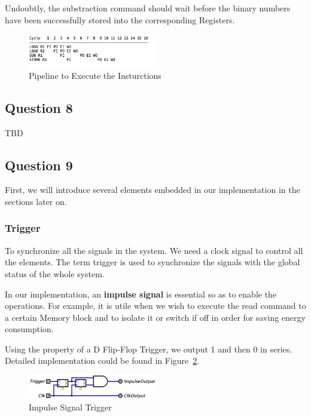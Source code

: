 \documentclass[conference]{IEEEtran}
\begin{document}
Undoubtly, the substraction command should wait before the binary numbers have been successfully stored into the corresponding Registers.

\begin{figure}[h!]
    \centering
    \includegraphics[width=0.5\textwidth]{assets/question-7.png}
    \caption{Pipeline to Execute the Insturctions}
    \label{fig:Question-7}
\end{figure}

\subsection{Question 8}


TBD

\subsection{Question 9}

First, we will introduce several elements embedded in our implementation in the sections later on.


\subsubsection{Trigger}



To synchronize all the signals in the system. We need a clock signal to control all the elements. The term trigger is used to synchronize the signals
with the global status of the whole system. 


In our implementation, an \textbf{impulse signal} is essential so as to enable the operations. For example, it is utile when we wish to execute the read command to a certain Memory block and to isolate it or switch if off in order for saving energy consumption.

Using the property of a D Flip-Flop Trigger, we output 1 and then 0 in series. Detailed implementation could be found in Figure~\ref{fig:impulse-output}.

\begin{figure}[h!]
    \centering
    \includegraphics[width=0.5\textwidth]{assets/impulse-output.png}
    \caption{Impulse Signal Trigger}
    \label{fig:impulse-output}
\end{figure}
\end{document}
